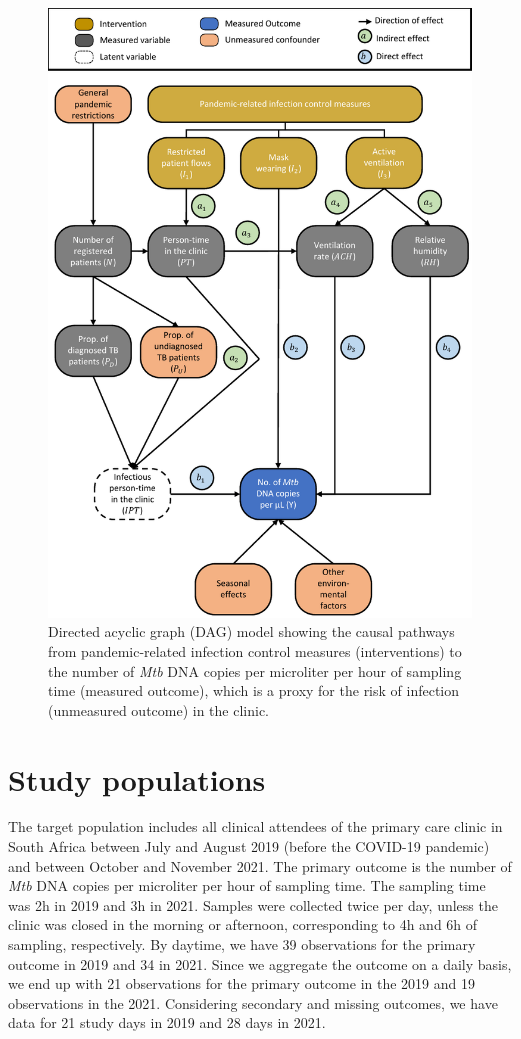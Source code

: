 \documentclass{article}
\begin{document}
\begin{figure}[!htpb]
    \centering
    \caption{Directed acyclic graph (DAG) model showing the causal pathways from pandemic-related infection control measures (interventions) to the number of \emph{Mtb} DNA copies per microliter per hour of sampling time (measured outcome), which is a proxy for the risk of infection (unmeasured outcome) in the clinic.}
    \label{fig:dag}
    \includegraphics[width=.8\linewidth]{dag.pdf}
\end{figure}
	
\section{Study populations}

The target population includes all clinical attendees of the primary care clinic in South Africa between July and August 2019 (before the COVID-19 pandemic) and between October and November 2021. The primary outcome is the number of \emph{Mtb} DNA copies per microliter per hour of sampling time. The sampling time was 2h in 2019 and 3h in 2021. Samples were collected twice per day, unless the clinic was closed in the morning or afternoon, corresponding to 4h and 6h of sampling, respectively. By daytime, we have 39 observations for the primary outcome in 2019 and 34 in 2021. Since we aggregate the outcome on a daily basis, we end up with 21 observations for the primary outcome in the 2019 and 19 observations in the 2021. Considering secondary and missing outcomes, we have data for 21 study days in 2019 and 28 days in 2021. 
\end{document}
